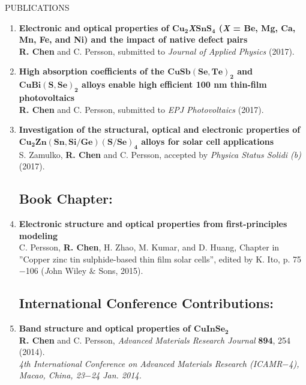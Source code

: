 \documentclass{resume} %
\begin{document}
\begin{rSection}{PUBLICATIONS}
\begin{enumerate}
\item{} \textbf{Electronic and optical properties of $\mathbf {Cu_{2}}$\textbf{\textit{X}}$\mathbf {SnS_{4}}$ (\textbf{\textit{X}} = Be, Mg, Ca, Mn, Fe, and Ni) and the impact of native defect pairs}
\\ \textbf{R. Chen} and C. Persson, submitted to \textit{Journal of Applied Physics} (2017).

\item{} \textbf{High absorption coefficients of the $\mathbf {CuSb(Se,Te)_2}$ and $\mathbf {CuBi(S,Se)_2}$ alloys enable high efficient 100 nm thin-film photovoltaics}
\\ \textbf{R. Chen} and C. Persson, submitted to \textit{EPJ Photovoltaics} (2017).

\item{} \textbf{Investigation of the structural, optical and electronic properties of $\mathbf{Cu_2}\mathbf{Zn(Sn,Si/Ge)}\mathbf{(S/Se)_4}$ alloys for solar cell applications}
\\ S. Zamulko, \textbf{R. Chen} and C. Persson, accepted by \textit{Physica Status Solidi (b)} (2017).



\renewcommand{\labelenumi}{\Roman{enumi}}
\setcounter{enumi}{0}

\subsection*{Book Chapter:}

\item{}\textbf{Electronic structure and optical properties from first-principles modeling} \\
C. Persson, \textbf{R. Chen}, H. Zhao, M. Kumar, and D. Huang, Chapter in ''Copper zinc tin sulphide-based thin film solar cells'',
edited by K. Ito, p. 75$-$106 ({\textit John Wiley $\&$ Sons}, 2015).



\subsection*{International Conference Contributions:}



\renewcommand{\labelenumi}{\Roman{enumi}}
\setcounter{enumi}{0}

\item{} \textbf{Band structure and optical properties of $\mathbf {CuInSe_2}$}
\\ \textbf{R. Chen} and C. Persson,
\textit{Advanced Materials Research Journal} {\textbf {894}}, 254 (2014). \\
\textit{4th International Conference on Advanced Materials Research (ICAMR$-$4), Macao, China, 23$-$24 Jan. 2014.}


\end{enumerate}
\end{rSection}
\end{document}
